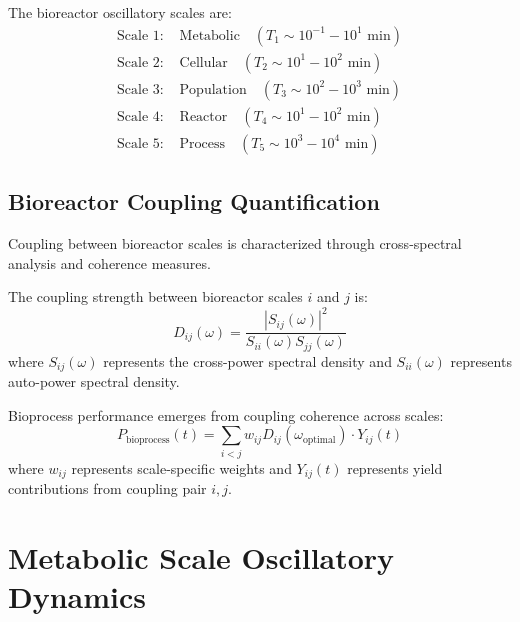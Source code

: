 \documentclass[twocolumn]{article}
\begin{document}
\begin{definition}
The bioreactor oscillatory scales are:
\begin{align}
\text{Scale 1: } &\text{Metabolic} \quad (T_1 \sim 10^{-1}-10^1 \text{ min}) \label{eq:metabolic} \\
\text{Scale 2: } &\text{Cellular} \quad (T_2 \sim 10^1-10^2 \text{ min}) \label{eq:cellular} \\
\text{Scale 3: } &\text{Population} \quad (T_3 \sim 10^2-10^3 \text{ min}) \label{eq:population} \\
\text{Scale 4: } &\text{Reactor} \quad (T_4 \sim 10^1-10^2 \text{ min}) \label{eq:reactor} \\
\text{Scale 5: } &\text{Process} \quad (T_5 \sim 10^3-10^4 \text{ min}) \label{eq:process}
\end{align}
\end{definition}

\subsection{Bioreactor Coupling Quantification}

Coupling between bioreactor scales is characterized through cross-spectral analysis and coherence measures.

\begin{definition}
The coupling strength between bioreactor scales $i$ and $j$ is:
\begin{equation}
D_{ij}(\omega) = \frac{|S_{ij}(\omega)|^2}{S_{ii}(\omega)S_{jj}(\omega)}
\label{eq:reactor_coupling}
\end{equation}
where $S_{ij}(\omega)$ represents the cross-power spectral density and $S_{ii}(\omega)$ represents auto-power spectral density.
\end{definition}

\begin{definition}
Bioprocess performance emerges from coupling coherence across scales:
\begin{equation}
P_{\text{bioprocess}}(t) = \sum_{i<j} w_{ij} D_{ij}(\omega_{\text{optimal}}) \cdot Y_{ij}(t)
\label{eq:performance_index}
\end{equation}
where $w_{ij}$ represents scale-specific weights and $Y_{ij}(t)$ represents yield contributions from coupling pair $i,j$.
\end{definition}

\section{Metabolic Scale Oscillatory Dynamics}
\end{document}
